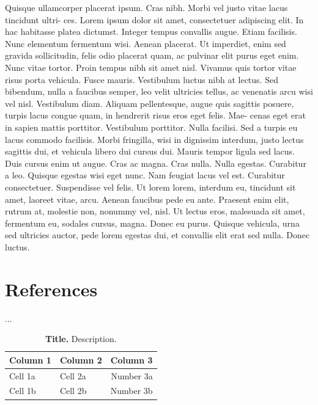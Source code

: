 \documentclass[a4paper,12pt]{article}
\begin{document}
Quisque ullamcorper placerat ipsum. Cras nibh. Morbi vel justo vitae lacus tincidunt ultri- ces. Lorem ipsum dolor sit amet, consectetuer adipiscing elit. In hac habitasse platea dictumst. Integer tempus convallis augue. Etiam facilisis. Nunc elementum fermentum wisi. Aenean placerat. Ut imperdiet, enim sed gravida sollicitudin, felis odio placerat quam, ac pulvinar elit purus eget enim. Nunc vitae tortor. Proin tempus nibh sit amet nisl. Vivamus quis tortor vitae risus porta vehicula. 
Fusce mauris. Vestibulum luctus nibh at lectus. Sed bibendum, nulla a faucibus semper, leo velit ultricies tellus, ac venenatis arcu wisi vel nisl. Vestibulum diam. Aliquam pellentesque, augue quis sagittis posuere, turpis lacus congue quam, in hendrerit risus eros eget felis. Mae- cenas eget erat in sapien mattis porttitor. Vestibulum porttitor. Nulla facilisi. Sed a turpis eu lacus commodo facilisis. Morbi fringilla, wisi in dignissim interdum, justo lectus sagittis dui, et vehicula libero dui cursus dui. Mauris tempor ligula sed lacus. Duis cursus enim ut augue. Cras ac magna. Cras nulla. Nulla egestas. Curabitur a leo. Quisque egestas wisi eget nunc. Nam feugiat lacus vel est. Curabitur consectetuer. 
Suspendisse vel felis. Ut lorem lorem, interdum eu, tincidunt sit amet, laoreet vitae, arcu. Aenean faucibus pede eu ante. Praesent enim elit, rutrum at, molestie non, nonummy vel, nisl. 
Ut lectus eros, malesuada sit amet, fermentum eu, sodales cursus, magna. Donec eu purus. Quisque vehicula, urna sed ultricies auctor, pede lorem egestas dui, et convallis elit erat sed nulla. Donec luctus. 


\section*{References}
\printbibliography[heading=none]

...


\begin{table}[h]
\centering
\caption{\textbf{Title.} Description.}
\label{tbl:my_table}
\begin{tabular}{@{}llr@{}}
\toprule
Column 1 & Column 2 & Column 3 \\ \midrule
Cell 1a & Cell 2a & Number 3a \\
Cell 1b & Cell 2b & Number 3b \\ \bottomrule
\end{tabular}
\end{table}
\end{document}
